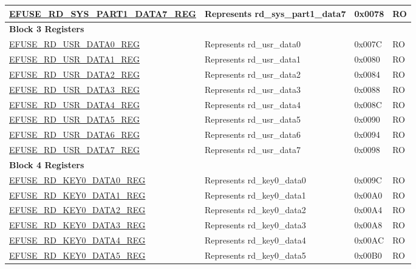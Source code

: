 \begin{longtable}{ | p{7cm} | p{6cm} | p{1.2cm} | p{1.5cm} | }
\hyperref[regdesc:EFUSERDSYSPART1DATANREG]{EFUSE\_RD\_SYS\_PART1\_DATA7\_REG} & Represents rd\_sys\_part1\_data7 & 0x0078 & RO \\ \hline
\multicolumn{4}{|l|}{\textbf{Block 3 Registers}} \\ \hline
\hyperref[regdesc:EFUSERDUSRDATANREG]{EFUSE\_RD\_USR\_DATA0\_REG} & Represents rd\_usr\_data0 & 0x007C & RO \\ \hline
\hyperref[regdesc:EFUSERDUSRDATANREG]{EFUSE\_RD\_USR\_DATA1\_REG} & Represents rd\_usr\_data1 & 0x0080 & RO \\ \hline
\hyperref[regdesc:EFUSERDUSRDATANREG]{EFUSE\_RD\_USR\_DATA2\_REG} & Represents rd\_usr\_data2 & 0x0084 & RO \\ \hline
\hyperref[regdesc:EFUSERDUSRDATANREG]{EFUSE\_RD\_USR\_DATA3\_REG} & Represents rd\_usr\_data3 & 0x0088 & RO \\ \hline
\hyperref[regdesc:EFUSERDUSRDATANREG]{EFUSE\_RD\_USR\_DATA4\_REG} & Represents rd\_usr\_data4 & 0x008C & RO \\ \hline
\hyperref[regdesc:EFUSERDUSRDATANREG]{EFUSE\_RD\_USR\_DATA5\_REG} & Represents rd\_usr\_data5 & 0x0090 & RO \\ \hline
\hyperref[regdesc:EFUSERDUSRDATANREG]{EFUSE\_RD\_USR\_DATA6\_REG} & Represents rd\_usr\_data6 & 0x0094 & RO \\ \hline
\hyperref[regdesc:EFUSERDUSRDATANREG]{EFUSE\_RD\_USR\_DATA7\_REG} & Represents rd\_usr\_data7 & 0x0098 & RO \\ \hline
\multicolumn{4}{|l|}{\textbf{Block 4 Registers}} \\ \hline
\hyperref[regdesc:EFUSERDKEY0DATANREG]{EFUSE\_RD\_KEY0\_DATA0\_REG} & Represents rd\_key0\_data0 & 0x009C & RO \\ \hline
\hyperref[regdesc:EFUSERDKEY0DATANREG]{EFUSE\_RD\_KEY0\_DATA1\_REG} & Represents rd\_key0\_data1 & 0x00A0 & RO \\ \hline
\hyperref[regdesc:EFUSERDKEY0DATANREG]{EFUSE\_RD\_KEY0\_DATA2\_REG} & Represents rd\_key0\_data2 & 0x00A4 & RO \\ \hline
\hyperref[regdesc:EFUSERDKEY0DATANREG]{EFUSE\_RD\_KEY0\_DATA3\_REG} & Represents rd\_key0\_data3 & 0x00A8 & RO \\ \hline
\hyperref[regdesc:EFUSERDKEY0DATANREG]{EFUSE\_RD\_KEY0\_DATA4\_REG} & Represents rd\_key0\_data4 & 0x00AC & RO \\ \hline
\hyperref[regdesc:EFUSERDKEY0DATANREG]{EFUSE\_RD\_KEY0\_DATA5\_REG} & Represents rd\_key0\_data5 & 0x00B0 & RO \\ \hline

\end{longtable}
